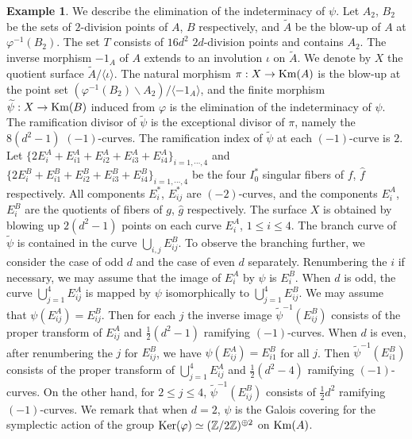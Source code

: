 \documentclass{article}
\theoremstyle{plain}
\theoremstyle{definition}
\newtheorem{example}[theorem]{Example}%
\theoremstyle{remark}
\newcommand{\Z}{{\mathbb Z}}
\begin{document}
\begin{example}
We describe the elimination of the indeterminacy of $\psi $.  
Let $A_{2}$, $B_{2}$ be the sets of $2$-division points of $A$, $B$ respectively, 
and $\widetilde{A}$ be the blow-up of $A$ at $\varphi ^{-1}(B_{2})$.  
The set $T$ consists of $16d^{2}$ $2d$-division points and contains $A_{2}$.  
The inverse morphism $-1_{A}$ of $A$ extends to 
an involution $\iota $ on $\widetilde{A}$.  
We denote by $X$ the quotient surface $\widetilde{A}/\langle \iota \rangle $.   
The natural morphism $\pi : X \to {\rm Km\/} (A)$ is the blow-up at the point set $(\varphi ^{-1}(B_{2})\backslash A_{2})/\langle -1_{A} \rangle $,   
and the finite morphism $\widetilde{\psi} : X \to {\rm Km\/} (B)$  induced from $\varphi $ 
is the elimination of the indeterminacy of $\psi $.   
The ramification divisor of $\widetilde{\psi}$ is the exceptional divisor of $\pi $,   
namely the $8(d^{2}-1)$ $(-1)$-curves.   
The ramification index of $\widetilde{\psi}$ at each $(-1)$-curve is $2$.   
Let 
$\{ 2E_{i}^{A} +E_{i1}^{A}+E_{i2}^{A}+E_{i3}^{A}+E_{i4}^{A} \} _{i=1,\cdots ,4} $  
and 
$\{ 2E_{i}^{B} +E_{i1}^{B}+E_{i2}^{B}+E_{i3}^{B}+E_{i4}^{B} \} _{i=1,\cdots ,4} $ 
be the four $I_{0}^{\ast}$ singular fibers of $f$, $\widehat{f}$ respectively.    
All components $E_{i}^{\ast}$,  $E_{ij}^{\ast}$ are $(-2)$-curves, 
and the components $E_{i}^{A}$, $E_{i}^{B}$ are the quotients of fibers of $g$, $\widehat{g}$ respectively.   
The surface $X$ is obtained by blowing up $2(d^{2}-1)$ points on each curve $E_{i}^{A}$, $1\leq i\leq 4$.   
The branch curve of $\widetilde{\psi}$ is contained in the curve $\bigcup _{i,j} E_{ij}^{B}$.   
To observe the branching further,   
we consider the case of odd $d$ and the case of even $d$ separately.   
Renumbering the $i$ if necessary, 
we may assume that the image of $E_{i}^{A}$ by $\psi $ is $E_{i}^{B}$.  
When $d$ is odd, 
the curve $\bigcup _{j=1}^{4} E_{ij}^{A}$ is mapped by $\psi $ isomorphically to $\bigcup _{j=1}^{4} E_{ij}^{B}$.   
We may assume that $\psi (E_{ij}^{A}) = E_{ij}^{B}$.  
Then for each $j$ 
the inverse image $\widetilde{\psi}^{-1}(E_{ij}^{B})$ consists of 
the proper transform of $E_{ij}^{A}$ and $\frac{1}{2}(d^{2}-1)$ ramifying $(-1)$-curves.   
When $d$ is even,   
after renumbering the $j$ for $E_{ij}^{B}$,   
we have 
$\psi (E_{ij}^{A}) = E_{i1}^{B}$ for all $j$.  
Then
$\widetilde{\psi}^{-1}(E_{i1}^{B})$ consists of 
the proper transform of  $\bigcup _{j=1}^{4} E_{ij}^{A}$  and  $\frac{1}{2}(d^{2}-4)$ ramifying $(-1)$-curves. 
On the other hand,  
for $2\leq j\leq 4$, $\widetilde{\psi}^{-1}(E_{ij}^{B})$ consists of $\frac{1}{2}d^{2}$ ramifying $(-1)$-curves.  
We remark that when $d=2$, 
$\psi $ is the Galois covering
for the symplectic action of the group ${\rm Ker\/}(\varphi ) \simeq ({\Z}/2{\Z})^{\oplus 2}$ on ${\rm Km\/} (A)$.  
\end{example}
\end{document}
